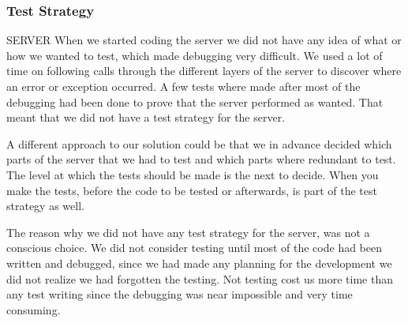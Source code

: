 \subsubsection{Test Strategy}
SERVER
When we started coding the server we did not have any idea of what or how we wanted to test, which made debugging very difficult. We used a lot of time on following calls through the different layers of the server to discover where an error or exception occurred. A few tests where made after most of the debugging had been done to prove that the server performed as wanted. That meant that we did not have a test strategy for the server.

A different approach to our solution could be that we in advance decided which parts of the server that we had to test and which parts where redundant to test. The level at which the tests should be made is the next to decide. When you make the tests, before the code to be tested or afterwards, is part of the test strategy as well.

The reason why we did not have any test strategy for the server, was not a conscious choice. We did not consider testing until most of the code had been written and debugged, since we had made any planning for the development we did not realize we had forgotten the testing. Not testing cost us more time than any test writing since the debugging was near impossible and very time consuming.